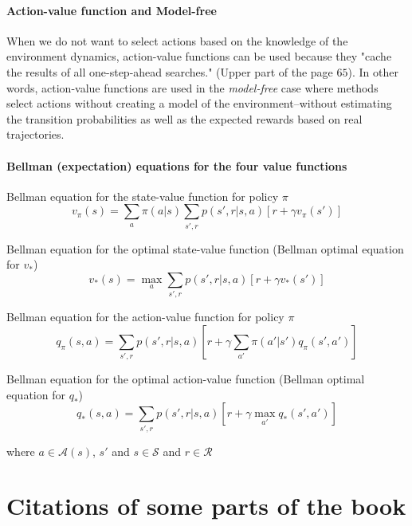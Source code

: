 \documentclass[10pt,a4paper]{article}
\begin{document}
\paragraph{Action-value function and Model-free} When we do not want to select actions based on the knowledge of the environment dynamics, action-value functions can be used because they "cache the results of all
one-step-ahead searches." (Upper part of the page $65$). In other words, action-value functions are used in the \textit{model-free} case where methods select actions without creating a model of the environment--without estimating the transition probabilities as well as the expected rewards based on real trajectories.

\paragraph{Bellman (expectation) equations for the four value functions}

Bellman equation for the state-value function for policy $\pi$
\begin{equation}
v_\pi(s) = \sum_{a} \pi(a \lvert s) \sum_{s', r} p(s', r \lvert s, a) \left[r + \gamma v_\pi(s')\right]
\end{equation}

Bellman equation for the optimal state-value function (Bellman optimal equation for $v_*$)
\begin{equation}
v_*(s) = \max_{a} \sum_{s', r} p(s', r \lvert s, a) \left[r + \gamma v_*(s')\right]
\end{equation}

Bellman equation for the action-value function for policy $\pi$
\begin{equation}
q_\pi(s, a) = \sum_{s', r} p(s', r \lvert s, a) \left[r + \gamma \sum_{a'} \pi(a' \lvert s') q_\pi(s', a')\right]
\end{equation}

Bellman equation for the optimal action-value function (Bellman optimal equation for $q_*$)
\begin{equation}
q_*(s, a) = \sum_{s', r} p(s', r \lvert s, a) \left[r + \gamma \max_{a'} q_*(s', a')\right]
\end{equation}


where $a \in \mathcal{A}(s)$, $s'$ and $s \in \mathcal{S}$ and $r \in \mathcal{R}$

\section{Citations of some parts of the book}
\end{document}
